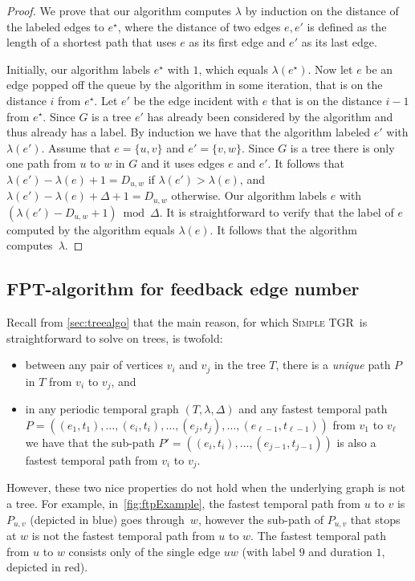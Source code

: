 \documentclass[a4paper,UKenglish,cleveref, autoref, thm-restate]{lipics-v2021}
\newcommand{\deltaExact}{\textsc{Simple TGR}}
\begin{document}
\begin{proof}
We prove that our algorithm computes $\lambda$ by induction on the distance of the labeled edges to $e^\star$, where the distance of two edges $e,e'$ is defined as the length of a shortest path that uses $e$ as its first edge and $e'$ as its last edge.

Initially, our algorithm labels $e^\star$ with $1$, which equals $\lambda(e^\star)$. Now let $e$ be an edge popped off the queue by the algorithm in some iteration, that is on the distance $i$ from $e^\star$. Let $e'$ be the edge incident with $e$ that is on the distance $i-1$ from $e^\star$. Since $G$ is a tree $e'$ has already been considered by the algorithm and thus already has a label. By induction we have that the algorithm labeled $e'$ with $\lambda(e')$. 
Assume that $e=\{u,v\}$ and $e'=\{v,w\}$. Since $G$ is a tree there is only one path from $u$ to $w$ in $G$ and it uses edges $e$ and $e'$. It follows that $\lambda(e')-\lambda(e)+1=D_{u,w}$ if $\lambda(e')>\lambda(e)$, and $\lambda(e')-\lambda(e)+\Delta+1=D_{u,w}$ otherwise. Our algorithm labels $e$ with $(\lambda(e')-D_{u,w}+1)\bmod \Delta$. It is straightforward to verify that the label of $e$ computed by the algorithm equals $\lambda(e)$. It follows that the algorithm computes~$\lambda$.
\end{proof}






\subsection{FPT-algorithm for feedback edge number}\label{sec:FPT}

Recall from \cref{sec:treealgo} that the main reason, for which \deltaExact\ is straightforward to solve on trees, is twofold: 
\begin{itemize}
    \item between any pair of vertices $v_i$ and $v_j$ in the tree $T$, there is a \emph{unique} path $P$ in $T$ from $v_i$ to $v_j$, and 
    \item in any periodic temporal graph $(T,\lambda,\Delta)$ and any fastest temporal path $P=((e_1,t_1),\ldots,(e_i,t_i),\ldots,(e_j,t_j),\ldots,(e_{\ell-1},t_{\ell-1}))$ from $v_1$ to $v_{\ell}$ we have that the sub-path $P'=((e_i,t_i),\ldots,(e_{j-1},t_{j-1}))$ is also a fastest temporal path from $v_i$ to $v_j$.
\end{itemize}
However, these two nice properties do not hold when the underlying graph is not a tree. For example, in~\cref{fig:ftpExample}, the fastest temporal path from $u$ to $v$ is $P_{u,v}$ (depicted in blue) goes through~$w$, however the sub-path of $P_{u,v}$ that stops at $w$ is not the fastest temporal path from $u$ to $w$. The fastest temporal path from $u$ to $w$ consists only of the single edge $uw$ (with label $9$ and duration $1$, depicted in red).
\end{document}
